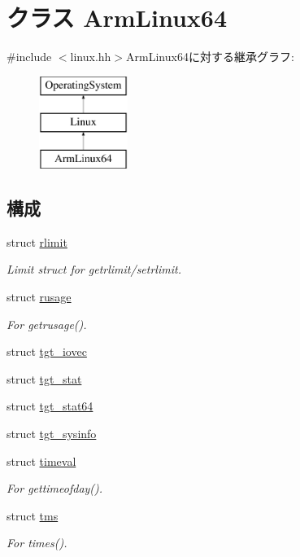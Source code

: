 \hypertarget{classArmLinux64}{
\section{クラス ArmLinux64}
\label{classArmLinux64}
}


{\ttfamily \#include $<$linux.hh$>$}ArmLinux64に対する継承グラフ:\begin{figure}[H]
\begin{center}
\leavevmode
\includegraphics[height=3cm]{classArmLinux64}
\end{center}
\end{figure}
\subsection*{構成}
\begin{DoxyCompactItemize}
\item 
struct \hyperlink{structArmLinux64_1_1rlimit}{rlimit}
\begin{DoxyCompactList}\small\item\em Limit struct for getrlimit/setrlimit. \item\end{DoxyCompactList}\item 
struct \hyperlink{structArmLinux64_1_1rusage}{rusage}
\begin{DoxyCompactList}\small\item\em For getrusage(). \item\end{DoxyCompactList}\item 
struct \hyperlink{structArmLinux64_1_1tgt__iovec}{tgt\_\-iovec}
\item 
struct \hyperlink{structArmLinux64_1_1tgt__stat}{tgt\_\-stat}
\item 
struct \hyperlink{structArmLinux64_1_1tgt__stat64}{tgt\_\-stat64}
\item 
struct \hyperlink{structArmLinux64_1_1tgt__sysinfo}{tgt\_\-sysinfo}
\item 
struct \hyperlink{structArmLinux64_1_1timeval}{timeval}
\begin{DoxyCompactList}\small\item\em For gettimeofday(). \item\end{DoxyCompactList}\item 
struct \hyperlink{structArmLinux64_1_1tms}{tms}
\begin{DoxyCompactList}\small\item\em For times(). \item\end{DoxyCompactList}\end{DoxyCompactItemize}
